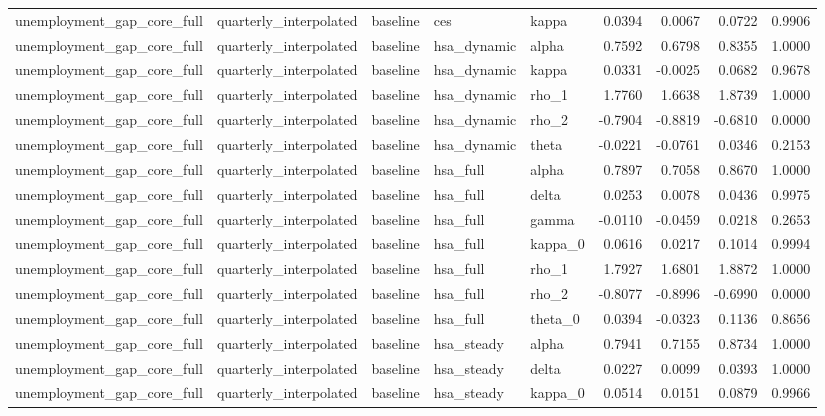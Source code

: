 \begin{tabular}{lllllrrrr}
unemployment\_gap\_core\_full & quarterly\_interpolated & baseline & ces & kappa & 0.0394 & 0.0067 & 0.0722 & 0.9906 \\
unemployment\_gap\_core\_full & quarterly\_interpolated & baseline & hsa\_dynamic & alpha & 0.7592 & 0.6798 & 0.8355 & 1.0000 \\
unemployment\_gap\_core\_full & quarterly\_interpolated & baseline & hsa\_dynamic & kappa & 0.0331 & -0.0025 & 0.0682 & 0.9678 \\
unemployment\_gap\_core\_full & quarterly\_interpolated & baseline & hsa\_dynamic & rho\_1 & 1.7760 & 1.6638 & 1.8739 & 1.0000 \\
unemployment\_gap\_core\_full & quarterly\_interpolated & baseline & hsa\_dynamic & rho\_2 & -0.7904 & -0.8819 & -0.6810 & 0.0000 \\
unemployment\_gap\_core\_full & quarterly\_interpolated & baseline & hsa\_dynamic & theta & -0.0221 & -0.0761 & 0.0346 & 0.2153 \\
unemployment\_gap\_core\_full & quarterly\_interpolated & baseline & hsa\_full & alpha & 0.7897 & 0.7058 & 0.8670 & 1.0000 \\
unemployment\_gap\_core\_full & quarterly\_interpolated & baseline & hsa\_full & delta & 0.0253 & 0.0078 & 0.0436 & 0.9975 \\
unemployment\_gap\_core\_full & quarterly\_interpolated & baseline & hsa\_full & gamma & -0.0110 & -0.0459 & 0.0218 & 0.2653 \\
unemployment\_gap\_core\_full & quarterly\_interpolated & baseline & hsa\_full & kappa\_0 & 0.0616 & 0.0217 & 0.1014 & 0.9994 \\
unemployment\_gap\_core\_full & quarterly\_interpolated & baseline & hsa\_full & rho\_1 & 1.7927 & 1.6801 & 1.8872 & 1.0000 \\
unemployment\_gap\_core\_full & quarterly\_interpolated & baseline & hsa\_full & rho\_2 & -0.8077 & -0.8996 & -0.6990 & 0.0000 \\
unemployment\_gap\_core\_full & quarterly\_interpolated & baseline & hsa\_full & theta\_0 & 0.0394 & -0.0323 & 0.1136 & 0.8656 \\
unemployment\_gap\_core\_full & quarterly\_interpolated & baseline & hsa\_steady & alpha & 0.7941 & 0.7155 & 0.8734 & 1.0000 \\
unemployment\_gap\_core\_full & quarterly\_interpolated & baseline & hsa\_steady & delta & 0.0227 & 0.0099 & 0.0393 & 1.0000 \\
unemployment\_gap\_core\_full & quarterly\_interpolated & baseline & hsa\_steady & kappa\_0 & 0.0514 & 0.0151 & 0.0879 & 0.9966 \\

\end{tabular}
